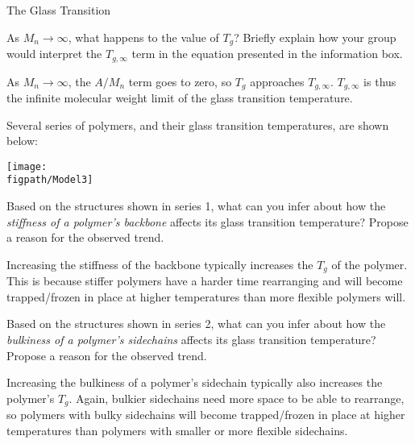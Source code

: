 \begin{activity}{The Glass Transition}
\begin{ctqs}
	\question As $M_n\to\infty$, what happens to the value of $T_g$?  Briefly explain how your group would interpret the $T_{g,\infty}$ term in the equation presented in the information box.
	
		\begin{solution}[1in]{}
			As $M_n\to\infty$, the $A/M_n$ term goes to zero, so $T_g$ approaches $T_{g,\infty}$.  $T_{g,\infty}$ is thus the infinite molecular weight limit of the glass transition temperature.
		\end{solution}
	
\end{ctqs}

\clearpage
\begin{model}
	\label{\labelbase:mdl:Tgdeterminants}

	Several series of polymers, and their glass transition temperatures, are shown below:
	
	\centerline{\texttt{[image: \\figpath/Model3]}}
	
\end{model}

\begin{ctqs}
	
	\question Based on the structures shown in series 1, what can you infer about how the \emph{stiffness of a polymer's backbone} affects its glass transition temperature?  Propose a reason for the observed trend.
	
		\begin{solution}[0.75in]{}
			Increasing the stiffness of the backbone typically increases the $T_g$ of the polymer.  This is because stiffer polymers have a harder time rearranging and will become trapped/frozen in place at higher temperatures than more flexible polymers will.
		\end{solution}
	

	\question Based on the structures shown in series 2, what can you infer about how the \emph{bulkiness of a polymer's sidechains} affects its glass transition temperature?  Propose a reason for the observed trend.
	
		\begin{solution}[0.75in]{}
			Increasing the bulkiness of a polymer's sidechain typically also increases the polymer's $T_g$.  Again, bulkier sidechains need more space to be able to rearrange, so polymers with bulky sidechains will become trapped/frozen in place at higher temperatures than polymers with smaller or more flexible sidechains.
		\end{solution}
	

\end{ctqs}
\end{activity}
